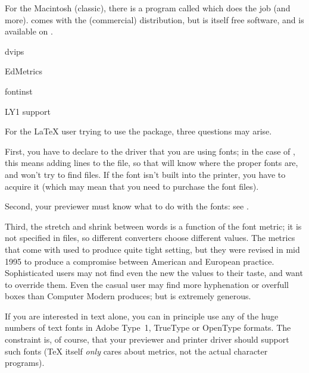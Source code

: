 For the Macintosh (classic), there is a program called
 which does the job (and more).
 comes with the (commercial)
 distribution, but is itself free
software, and is available on .
\begin{ctanrefs}
\item[dvips]
\item[EdMetrics]
\item[fontinst]
\item[LY1 support]
\end{ctanrefs}


For the \LaTeX{} user trying to use the
 package, three questions may arise.

First, you have to declare to the  driver that you are using
\PS{} fonts; in the case of , this means adding
lines to the  file, so that  will know
where the proper fonts are, and won't try to find  
files.  If the font isn't built into the printer, you have to acquire
it (which may mean that you need to purchase the font files).

Second, your previewer must know what to do with the fonts: see
.

Third, the stretch and shrink between words is a function of the
font metric; it is not specified in  files, so different converters
choose different values. The \PS{} metrics that come with  
used to produce quite tight setting, but they were revised in mid 1995
to produce a compromise between American and European practice. 
Sophisticated users may not find even the new the values to their taste, and
want to override them. Even the casual user may find  more
hyphenation or overfull boxes than Computer Modern produces; but 
is extremely generous. 


If you are interested in text alone, you can in principle use any of
the huge numbers of text fonts in Adobe Type~1, TrueType or OpenType
formats.  The constraint is, of course, that your previewer and
printer driver should support such fonts (\TeX{} itself \emph{only}
cares about metrics, not the actual character programs).


